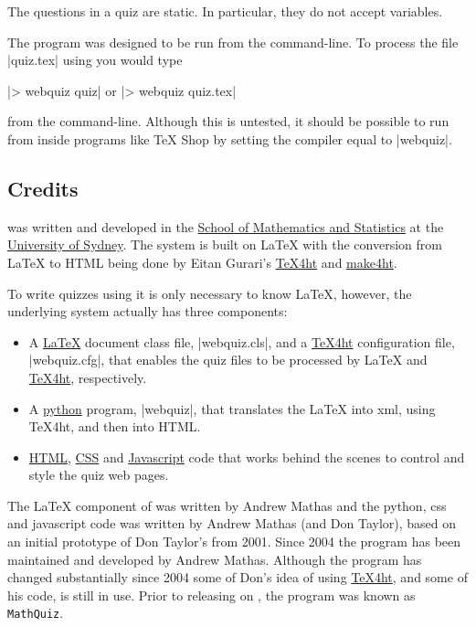 \documentclass[svgnames]{article}
\newcommand\TeXfht{\href{https://www.ctan.org/tex4ht}{TeX4ht}\xspace}
\newcommand\Ctan{\ctan[]{ctan}}
\begin{document}
    The questions in a \WebQuiz quiz are static. In particular, they do
    not accept variables.

    The \WebQuiz program was designed to be run from the command-line.
    To process the file \BashCode|quiz.tex| using \WebQuiz you would
    type

    \BashCode|> webquiz quiz| \qquad or \qquad
    \BashCode|> webquiz quiz.tex|

    \noindent from the command-line. Although this is untested, it
    should be possible to run \WebQuiz from inside programs like \TeX
    Shop by setting the compiler equal to \BashCode|webquiz|.

\subsection{Credits}
    \WebQuiz{} was written and developed in the
    \href{http://www.maths.usyd.edu.au/}{School of Mathematics and
    Statistics} at the \href{http://www.usyd.edu.au/}{University of
    Sydney}.  The system is built on \LaTeX{} with the conversion from
    \LaTeX{} to HTML being done by Eitan Gurari's
    \href{http://www.cis.ohio-state.edu/~gurari/TeXfht/mn.html}{TeX4ht}
    and
    \href{https://github.com/michal-h21/make4ht}{make4ht}.

    To write quizzes using \WebQuiz it is only necessary to know
    \LaTeX, however, the underlying \WebQuiz system actually has three
    components:
    \begin{itemize}
      \item A \href{https://www.latex-project.org/}{\LaTeX} document class
      file, \BashCode|webquiz.cls|, and a \TeXfht
      configuration file, \BashCode|webquiz.cfg|, that enables the
      quiz files to be processed by \LaTeX{} and \TeXfht, respectively.
      \item A \href{https://www.python.org/}{python} program,
      \BashCode|webquiz|, that translates the
      \LaTeX{} into xml, using \TeX 4ht, and then into HTML.
      \item
      \href{https://www.w3schools.com/html/html_intro.asp}{HTML},
      \href{https://www.w3schools.com/css/}{CSS} and
      \href{https://www.w3schools.com/Js/}{Javascript}
      code that works behind the scenes to control and style the quiz
      web pages.
    \end{itemize}

   The \LaTeX{} component of \WebQuiz{} was written by Andrew Mathas and
   the python, css and javascript code was written by Andrew Mathas (and
   Don Taylor), based on an initial prototype of Don Taylor's from 2001.
   Since 2004 the program has been maintained and developed by Andrew
   Mathas. Although the program has changed substantially since 2004
   some of Don's idea of using \TeXfht, and some of his code, is still
   in use. Prior to releasing \WebQuiz on \Ctan, the program was known
   as \texttt{MathQuiz}.
\end{document}
